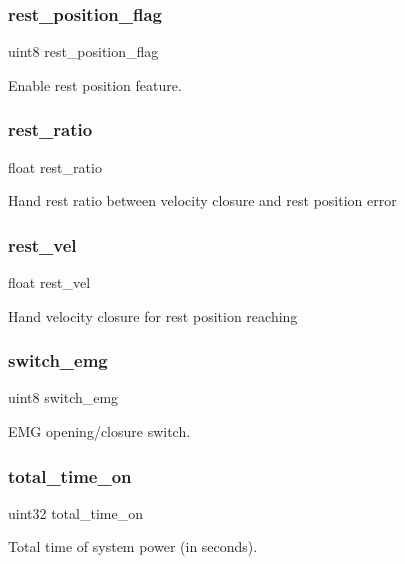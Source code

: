 \subsubsection{rest\+\_\+position\+\_\+flag}
{\footnotesize\ttfamily uint8 rest\+\_\+position\+\_\+flag}

Enable rest position feature. \mbox{\label{structst__mem_a36ce85c7c822c5a1c014aed67f47f5e7}} 
\subsubsection{rest\+\_\+ratio}
{\footnotesize\ttfamily float rest\+\_\+ratio}

Hand rest ratio between velocity closure and rest position error \mbox{\label{structst__mem_ac1ad7e4ba4a8bd648b4f8d9ee6105e3c}} 
\subsubsection{rest\+\_\+vel}
{\footnotesize\ttfamily float rest\+\_\+vel}

Hand velocity closure for rest position reaching \mbox{\label{structst__mem_a90c7b59f97a26bf3da8b26b145b32919}} 
\subsubsection{switch\+\_\+emg}
{\footnotesize\ttfamily uint8 switch\+\_\+emg}

E\+MG opening/closure switch. \mbox{\label{structst__mem_afb43d3b7ca83fb698b54d4b6f52d8b45}} 
\subsubsection{total\+\_\+time\+\_\+on}
{\footnotesize\ttfamily uint32 total\+\_\+time\+\_\+on}

Total time of system power (in seconds). \mbox{\label{structst__mem_ace38ca6ca20492e8f6cc0f4684d6dd44}} 
